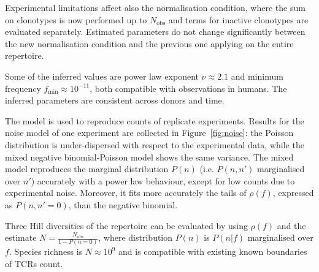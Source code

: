 \documentclass[a4paper,twocolumn]{article}
\begin{document}
Experimental limitations affect also the normalisation condition, where the sum on clonotypes is now performed up to $N_\mathrm{obs}$ and terms for inactive clonotypes are evaluated separately. Estimated parameters do not change significantly between the new normalisation condition and the previous one applying on the entire repertoire.

Some of the inferred values are power law exponent $\nu \approx 2.1$ and minimum frequency $f_\mathrm{min} \approx 10^{-11}$, both compatible with observations in humans. The inferred parameters are consistent across donors and time.

The model is used to reproduce counts of replicate experiments. Results for the noise model of one experiment are collected in Figure~\ref{fig:noise}: the Poisson distribution is under-dispersed with respect to the experimental data, while the mixed negative binomial-Poisson model shows the same variance. The mixed model reproduces the marginal distribution $P(n)$ (i.e. $P(n, n')$ marginalised over $n'$) accurately with a power law behaviour, except for low counts due to experimental noise. Moreover, it fits more accurately the tails of $\rho(f)$, expressed as $P(n, n' = 0)$, than the negative binomial.

Three Hill diversities of the repertoire can be evaluated by using $\rho(f)$ and the estimate $N = \frac{N_\mathrm{obs}}{1 - P(n = 0)}$, where distribution $P(n)$ is $P(n|f)$ marginalised over $f$. Species richness is $N \approx 10^9$ and is compatible with existing known boundaries of TCRs count.
\end{document}

